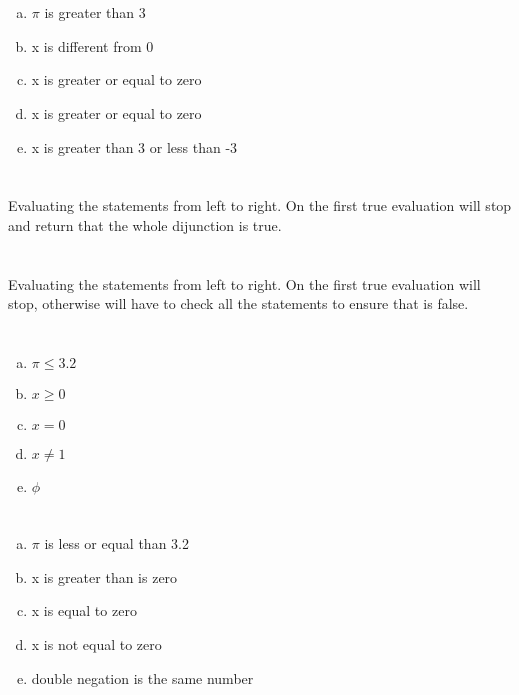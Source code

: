 \documentclass{article}
\begin{document}
\section{}
\begin{enumerate}[a.]
\item $\pi$ is greater than 3
\item x is different from 0
\item x is greater or equal to zero
\item x is greater or equal to zero
\item x is greater than 3 or less than -3
\end{enumerate}

\section{}
Evaluating the statements from left to right. On the first true evaluation will stop and return that the whole dijunction is true.

\section{}
Evaluating the statements from left to right. On the first true evaluation will stop, otherwise will have to check all the statements to ensure that is false.

\section{}
\begin{enumerate}[a.]
\item $\pi \leq 3.2$
\item $x \geq 0$
\item $x=0$
\item $x \neq 1$
\item $\phi$
\end{enumerate}

\section{}
\begin{enumerate}[a.]
\item $\pi$ is less or equal than 3.2
\item x is greater than is zero
\item x is equal to zero
\item x is not equal to zero
\item double negation is the same number
\end{enumerate}
\end{document}
